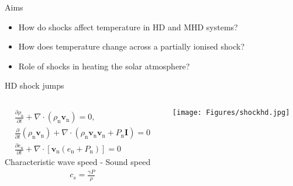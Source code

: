 \documentclass[10pt,aspectratio=169,usenames,dvipsnames]{beamer}
\begin{document}
\begin{frame}{Aims}
\begin{itemize}
    \item How do shocks affect temperature in HD and MHD systems?
    \item How does temperature change across a partially ionised shock?
    \item Role of shocks in heating the solar atmosphere?
\end{itemize}
\end{frame}


\begin{frame}{HD shock jumps}
\begin{columns}
\begin{column}{0.4\textwidth}
\footnotesize
\begin{gather}
\frac{\partial \rho _{\text{n}}}{\partial t} + \nabla \cdot (\rho _{\text{n}} \textbf{v}_{\text{n}})= 0, \label{eqn:neutral1} \\
\frac{\partial}{\partial t}(\rho _{\text{n}} \textbf{v}_{\text{n}}) + \nabla \cdot (\rho _{\text{n}} \textbf{v}_{\text{n}} \textbf{v}_{\text{n}} + P_{\text{n}} \textbf{I}) = 0\\
\frac{\partial e_{\text{n}}}{\partial t} + \nabla \cdot \left[\textbf{v}_{\text{n}} (e_{\text{n}} +P_{\text{n}}) \right] = 0 
\end{gather}
Characteristic wave speed - Sound speed 
\begin{gather}
    c_s=\frac{\gamma P}{\rho}
\end{gather}
\end{column}
\begin{column}{0.6\textwidth}
\texttt{[image: Figures/shockhd.jpg]}
\end{column}
\end{columns}
\end{frame}
\end{document}
